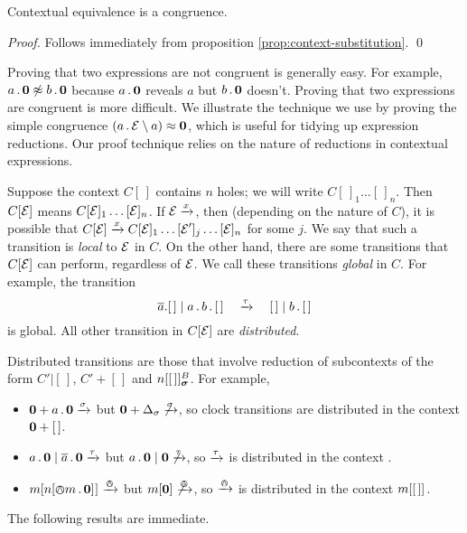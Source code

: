 \documentclass[orivec,envcountsame]{llncs}
\newcommand{\Eq}{\approx}
\newcommand{\NotEq}{\not\approx}
\newcommand{\Does}[1]{\xderives{#1}}
\begin{document}
\begin{theorem}
Contextual equivalence is a congruence.
\end{theorem}
\begin{proof}
Follows immediately from proposition \ref{prop:context-substitution}.
\qed \end{proof}


Proving that two expressions are not congruent is generally easy. For
example, $a\pref\nil \NotEq b\pref\nil$ because $a\,.\,\textbf{0}$ reveals $a$
but $b\,.\,\textbf{0}$ doesn't. Proving that two expressions are congruent is
more difficult. We illustrate the technique we use by proving the simple
congruence $\left(a\pref\expr \res{a}\right) \Eq \nil$, which is useful
for tidying up expression reductions. Our proof technique relies on the
nature of reductions in contextual expressions.

Suppose the context $C[\,]$ contains $n$ holes; we will write
$C[\,]_1\dots[\,]_n$. Then $C[\text{$\mathcal{E}$}]$ means
$C[\text{$\mathcal{E}$}]_1\dots[\text{$\mathcal{E}$}]_n$. If $\expr \Does{x}$, then (depending on the
nature of $C$), it is possible that $C[\expr] \Does{x}
C[\expr]_1\dots[\expr']_j\dots[\expr]_n$ for some $j$. We say that such
a transition is \emph{local} to $\text{$\mathcal{E}$}$ in $C$. On the other hand, there
are some transitions that $C[\text{$\mathcal{E}$}]$ can perform, regardless of
$\text{$\mathcal{E}$}$. We call these transitions \emph{global} in $C$. For example,
the transition
\[
\out{a}.[\,] \mid a \pref b \pref [\,] \quad\Does{\tau}\quad [\,] \mid b
\pref [\,] \] is global. All other transition in $C[\text{$\mathcal{E}$}]$ are
\emph{distributed}.

Distributed transitions are those that involve reduction of subcontexts
of the form $C'|[\,]$, $C' + [\,]$ and
$\locv{n}{[\,]}{B}{\vec{\sigma}}$. For example,
\begin{itemize}
\item
    $\nil + a\pref\nil \Does{\sigma}$ but $\nil + \Delta_\sigma
     \not\Does{\sigma}$, so clock transitions are distributed in the
     context $\textbf{0} + [\,]$.
\item
    $a\pref\nil \mid \out{a}\pref\nil \Does{\tau}$ but $a\pref\nil \mid
     \nil \not\Does{\tau}$, so $\Does{\tau}$ is distributed in the
     context .
\item
    $\locv{m}{ \locv{n}{\tntout{m}\pref\nil}{}{} }{}{} \Does{\tout}$ but
    $\locv{m}{ \nil }{}{} \not\Does{\tout}$, so $\Does{\tout}$ is
     distributed in the context ${m}[  [\,]  ]^{}_{}$.
\end{itemize}
The following results are immediate.
\end{document}
